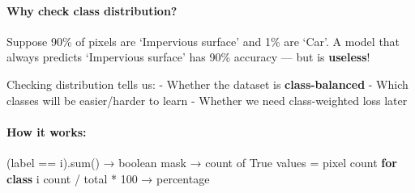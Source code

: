 \documentclass[11pt]{article}
\newenvironment{Shaded}{}{}
\newcommand{\KeywordTok}[1]{\textcolor[rgb]{0.00,0.44,0.13}{\textbf{{#1}}}}
\newcommand{\DecValTok}[1]{\textcolor[rgb]{0.25,0.63,0.44}{{#1}}}
\newcommand{\NormalTok}[1]{{#1}}
\newcommand{\VariableTok}[1]{\textcolor[rgb]{0.10,0.09,0.49}{{#1}}}
\newcommand{\ControlFlowTok}[1]{\textcolor[rgb]{0.00,0.44,0.13}{\textbf{{#1}}}}
\newcommand{\OperatorTok}[1]{\textcolor[rgb]{0.40,0.40,0.40}{{#1}}}
\newcommand{\BuiltInTok}[1]{{#1}}
\begin{document}
\paragraph{Why check class
distribution?}\label{why-check-class-distribution}

Suppose 90\% of pixels are `Impervious surface' and 1\% are `Car'. A
model that always predicts `Impervious surface' has 90\% accuracy ---
but is \textbf{useless}!

Checking distribution tells us: - Whether the dataset is
\textbf{class-balanced} - Which classes will be easier/harder to learn -
Whether we need class-weighted loss later

\paragraph{How it works:}\label{how-it-works}

\begin{Shaded}
\begin{Highlighting}[]
\NormalTok{(label }\OperatorTok{==}\NormalTok{ i).}\BuiltInTok{sum}\NormalTok{()   →  boolean mask → count of }\VariableTok{True}\NormalTok{ values }\OperatorTok{=}\NormalTok{ pixel count }\ControlFlowTok{for} \KeywordTok{class}\NormalTok{ i}
\NormalTok{count }\OperatorTok{/}\NormalTok{ total }\OperatorTok{*} \DecValTok{100}\NormalTok{  →  percentage}
\end{Highlighting}
\end{Shaded}
\end{document}
